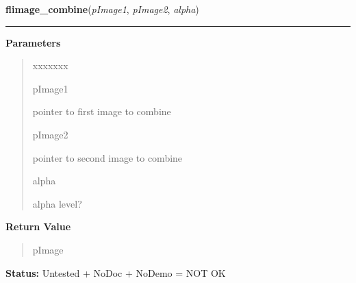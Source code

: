 \hspace{.8\funcindent}\begin{boxedminipage}{\funcwidth}

    \raggedright \textbf{flimage\_combine}(\textit{pImage1}, \textit{pImage2}, \textit{alpha})

    \vspace{-1.5ex}

    \rule{\textwidth}{0.5\fboxrule}
\setlength{\parskip}{2ex}
\setlength{\parskip}{1ex}
      \textbf{Parameters}
      \vspace{-1ex}

      \begin{quote}
        \begin{Ventry}{xxxxxxx}

          \item[pImage1]

          pointer to first image to combine

          \item[pImage2]

          pointer to second image to combine

          \item[alpha]

          alpha level?

        \end{Ventry}

      \end{quote}

      \textbf{Return Value}
    \vspace{-1ex}

      \begin{quote}
      pImage

      \end{quote}

\textbf{Status:} Untested + NoDoc + NoDemo = NOT OK



    \end{boxedminipage}

    \label{xformslib:library:flimage_display_markers}

    \vspace{0.5ex}

